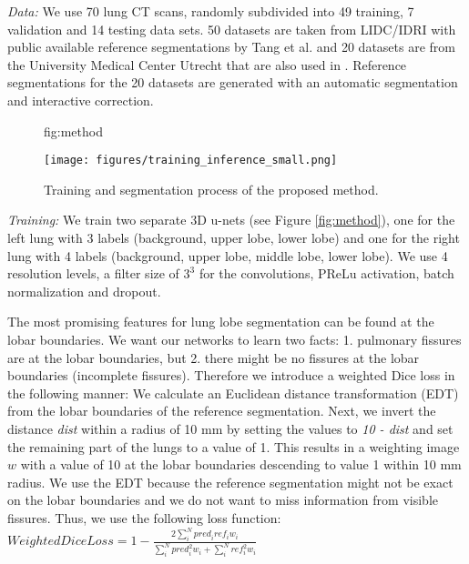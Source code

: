 \documentclass{midl} %
\begin{document}
\emph{Data:} We use 70 lung CT scans, randomly subdivided into 49 training, 7 validation and 14 testing data sets.   
50 datasets are taken from LIDC/IDRI \cite{armato2011} with public available reference segmentations by Tang et al. \cite{tang2019} and 20 datasets are from the University Medical Center Utrecht that are also used in \cite{lassen2013}. Reference segmentations for the 20 datasets are generated with an automatic segmentation and interactive correction. 

\begin{figure}[htbp]
\floatconts
  {fig:method}
  {\caption{Training and segmentation process of the proposed method.}}
  {\centering\texttt{[image: figures/training\_inference\_small.png]}}
\end{figure}
\vspace{-1mm}
\emph{Training:} We train two separate 3D u-nets (see Figure \ref{fig:method}), one for the left lung with 3 labels (background, upper lobe, lower lobe) and one for the right lung with 4 labels (background, upper lobe, middle lobe, lower lobe). 
We use 4 resolution levels, a filter size of $3^{3}$ for the convolutions, PReLu activation, batch normalization and dropout. 

The most promising features for lung lobe segmentation can be found at the lobar boundaries. %
We want our networks to learn two facts: 1. pulmonary fissures are at the lobar boundaries, but 2. there might be no fissures at the lobar boundaries (incomplete fissures). 
Therefore we introduce a weighted Dice loss in the following manner: We calculate an Euclidean distance transformation (EDT) from the lobar boundaries of the reference segmentation. Next, we invert the distance \emph{dist}
within a radius of 10 mm by setting the values to \emph{10 - dist} and set the remaining part of the lungs to a value of 1. This results in a weighting image $w$ with a value of 10 at the lobar boundaries descending to value 1 within 10 mm radius. We use the EDT because the reference segmentation might not be exact on the lobar boundaries and we do not want to miss information from visible fissures. Thus, we use the following loss function: 
$Weighted Dice Loss = 1- \frac{2\sum\nolimits_{i}^N{pred}_{i}{ref}_{i}{w}_{i}}{\sum\nolimits_{i}^N {pred}_{i}^2{w}_{i} + \sum\nolimits_{i}^N {ref}_{i}^2{w}_{i}}$
\end{document}
